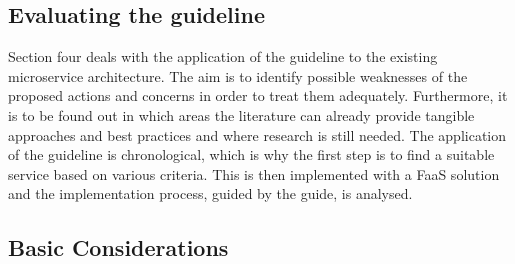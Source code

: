 \documentclass[a4paper,11pt, pagesize]{scrartcl}
\begin{document}
\begin{spacing}{1.2}
\section{Evaluating the guideline}
Section four deals with the application of the guideline to the existing microservice architecture. The aim is to identify possible weaknesses of the proposed actions and concerns in order to treat them adequately. Furthermore, it is to be found out in which areas the literature can already provide tangible approaches and best practices and where research is still needed. The application of the guideline is chronological, which is why the first step is to find a suitable service based on various criteria. This is then implemented with a FaaS solution and the implementation process, guided by the guide, is analysed.
\subsection{Basic Considerations}

\end{spacing}
\end{document}

